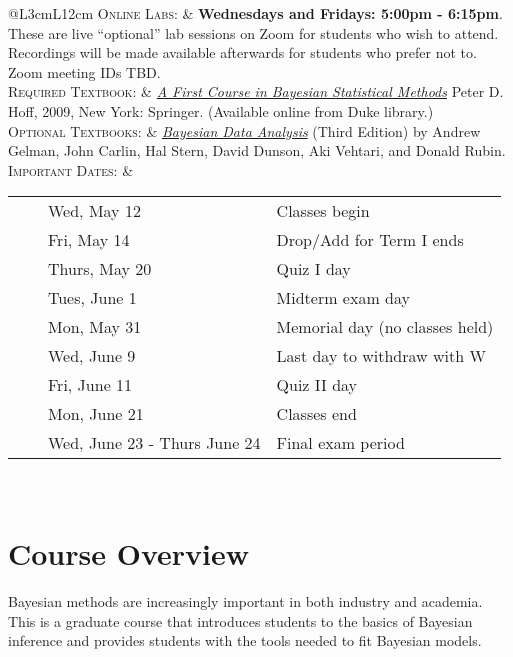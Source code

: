 \documentclass[11pt, a4paper]{article}
\newcommand{\tabitem}{~~\llap{\textbullet}~~}
\begin{document}
\begin{center}
\begin{minipage}[t]{.9\textwidth}
\begin{tabular}{@{}L{3cm}L{12cm}}
			\textsc{Online Labs:} & \textbf{Wednesdays and Fridays: 5:00pm - 6:15pm}. These are live ``optional'' lab sessions on Zoom  for students who wish to attend. Recordings will be made available afterwards for students who prefer not to. Zoom meeting IDs TBD. \\
			\textsc{Required Textbook:} & \href{https://find.library.duke.edu/catalog/DUKE004968562}{\textit{A First Course in Bayesian Statistical Methods}} Peter D. Hoff, 2009, New York: Springer. (Available online from Duke library.)\\
			\textsc{Optional Textbooks:}	& \href{http://www.amazon.com/Bayesian-Analysis-Chapman-Statistical-Science/dp/1439840954/}{\textit{Bayesian Data Analysis}} (Third Edition) by Andrew Gelman, John Carlin, Hal Stern, David Dunson, Aki Vehtari, and Donald Rubin. \\
			\textsc{Important Dates:} & \begin{minipage}[t]{.9\textwidth}
				\begin{tabular}{@{}ll}
					\tabitem Wed, May 12 & Classes begin \\
					\tabitem Fri, May 14 & Drop/Add for Term I ends \\
					\tabitem Thurs, May 20 & Quiz I day\\
					\tabitem Tues, June 1 & Midterm exam day\\
					\tabitem Mon, May 31 & Memorial day (no classes held) \\
					\tabitem Wed, June 9 & Last day to withdraw with W \\
					\tabitem Fri, June 11 & Quiz II day\\
					\tabitem Mon, June 21 & Classes end \\
					\tabitem Wed, June 23 - Thurs June 24 & Final exam period \\
				\end{tabular}
			\end{minipage} \\
			\bottomrule[0.065cm]
		\end{tabular}
	\end{minipage}
\end{center}





\vspace{.5cm}
\setlength{\unitlength}{1in}
\renewcommand{\arraystretch}{1.5}



\section{Course Overview}
Bayesian methods are increasingly important in both industry and academia. This is a graduate course that introduces students to the basics of Bayesian inference and provides students with the tools needed to fit Bayesian models.
\end{document}

